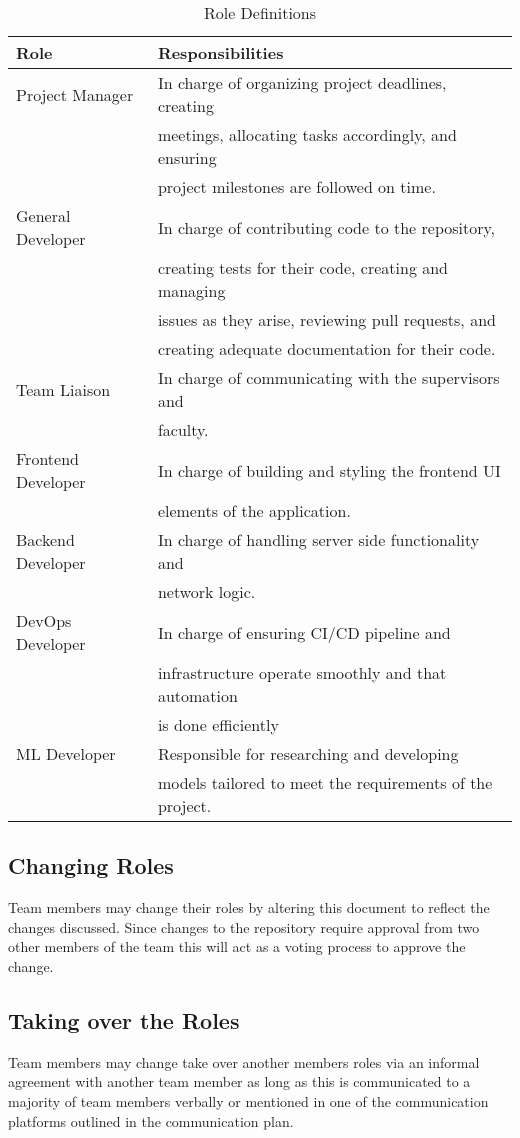 \documentclass{article}
\begin{document}
\begin{table}[H]
\caption{Role Definitions}
\label{tab:role-definitions}
\begin{tabular}{|l|l|}
\hline 
\textbf{Role} & \textbf{Responsibilities} \\
\hline 
Project Manager & In charge of organizing project deadlines, creating \\
& meetings, allocating tasks accordingly, and ensuring \\
& project milestones are followed on time.\\
\hline
General Developer & In charge of contributing code to the repository,\\
& creating tests for their code, creating and managing \\
& issues as they arise, reviewing pull requests, and \\
& creating adequate documentation for their code.\\
\hline 
Team Liaison & In charge of communicating with the supervisors and \\
& faculty.\\
\hline 
Frontend Developer & In charge of building and styling the frontend UI \\
& elements of the application. \\
\hline 
Backend Developer & In charge of handling server side functionality and \\
&  network logic.\\
\hline 
DevOps Developer & In charge of ensuring CI/CD pipeline and \\ 
& infrastructure operate smoothly and that automation \\ 
& is done efficiently\\
\hline 
ML Developer & Responsible for researching and developing \\
& models tailored to meet the requirements of the project. \\
\hline
\end{tabular}
\end{table}

\subsection{Changing Roles}
Team members may change their roles by altering this document to reflect the changes discussed. Since changes to the repository require approval from two other members of the team this will act as a voting process to approve the change.
\subsection{Taking over the  Roles}
Team members may change take over another members roles via an informal agreement with another team member as long as this is communicated to a majority of team members verbally or mentioned in one of the communication platforms outlined in the communication plan.
\end{document}
